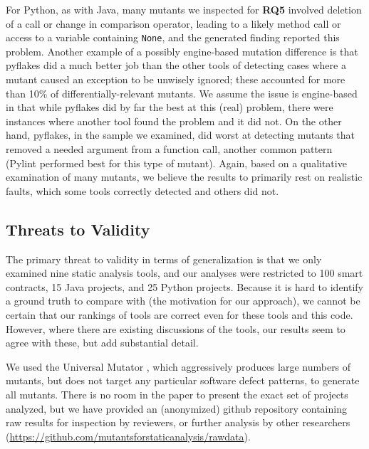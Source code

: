 For Python, as with Java, many mutants we inspected for {\bf RQ5} involved deletion of a call or change in comparison operator, leading to a likely method call or access to a variable containing {\tt None}, and the generated finding reported this problem.  Another example of a possibly engine-based mutation difference is that pyflakes did a much better job than the other tools of detecting cases where a mutant caused an exception to be unwisely ignored; these accounted for more than 10\% of differentially-relevant mutants.  We assume the issue is engine-based in that while pyflakes did by far the best at this (real) problem, there were instances where another tool found the problem and it did not.  On the other hand, pyflakes, in the sample we examined, did worst at detecting mutants that removed a needed argument from a function call, another common pattern (Pylint performed best for this type of mutant).  Again, based on a qualitative examination of many mutants, we believe the results to primarily rest on realistic faults, which some tools correctly detected and others did not.

\subsection{Threats to Validity}

The primary threat to validity in terms of generalization is that we only examined nine static analysis tools, and our analyses were restricted to 100 smart contracts, 15 Java projects, and 25 Python projects.   Because it is hard to identify a ground truth to compare with (the motivation for our approach), we cannot be certain that our rankings of tools are correct even for these tools and this code.  However, where there are existing discussions of the tools, our results seem to agree with these, but add substantial detail.

We used the Universal Mutator \cite{universalmutator,regexpMut}, which aggressively produces large numbers of mutants, but does not target any particular software defect patterns, to generate all mutants.
There is no room in the paper to present the exact set of projects analyzed, but we have provided an (anonymized) github repository containing raw results for inspection by reviewers, or further analysis by other researchers (\url{https://github.com/mutantsforstaticanalysis/rawdata}).